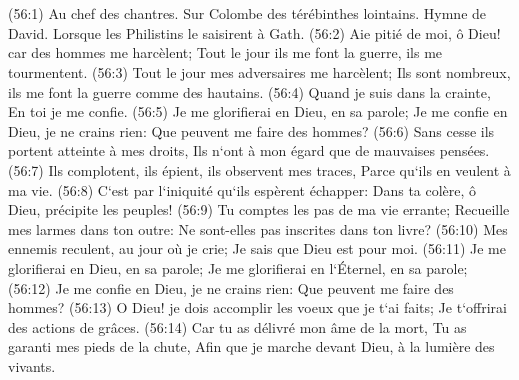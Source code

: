 \chapter{}

\verse (56:1) Au chef des chantres. Sur Colombe des térébinthes lointains. Hymne de David. Lorsque les Philistins le saisirent à Gath. (56:2) Aie pitié de moi, ô Dieu! car des hommes me harcèlent; Tout le jour ils me font la guerre, ils me tourmentent. 
\verse (56:3) Tout le jour mes adversaires me harcèlent; Ils sont nombreux, ils me font la guerre comme des hautains. 
\verse (56:4) Quand je suis dans la crainte, En toi je me confie. 
\verse (56:5) Je me glorifierai en Dieu, en sa parole; Je me confie en Dieu, je ne crains rien: Que peuvent me faire des hommes? 
\verse (56:6) Sans cesse ils portent atteinte à mes droits, Ils n`ont à mon égard que de mauvaises pensées. 
\verse (56:7) Ils complotent, ils épient, ils observent mes traces, Parce qu`ils en veulent à ma vie. 
\verse (56:8) C`est par l`iniquité qu`ils espèrent échapper: Dans ta colère, ô Dieu, précipite les peuples! 
\verse (56:9) Tu comptes les pas de ma vie errante; Recueille mes larmes dans ton outre: Ne sont-elles pas inscrites dans ton livre? 
\verse (56:10) Mes ennemis reculent, au jour où je crie; Je sais que Dieu est pour moi. 
\verse (56:11) Je me glorifierai en Dieu, en sa parole; Je me glorifierai en l`Éternel, en sa parole; 
\verse (56:12) Je me confie en Dieu, je ne crains rien: Que peuvent me faire des hommes? 
\verse (56:13) O Dieu! je dois accomplir les voeux que je t`ai faits; Je t`offrirai des actions de grâces. 
\verse (56:14) Car tu as délivré mon âme de la mort, Tu as garanti mes pieds de la chute, Afin que je marche devant Dieu, à la lumière des vivants. 

\chapter{}


